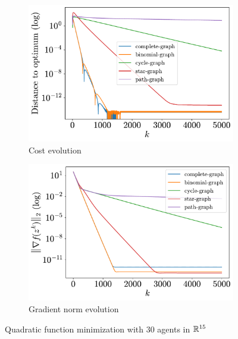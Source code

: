 \documentclass[a4paper,11pt,oneside]{book}
\begin{document}
\begin{figure}[H]
      \centering
      \begin{subfigure}[t]{0.46\linewidth}
            \centering
            \includegraphics[width=\linewidth]{./figs/quadratic/30_15/distance.pdf} 
            \caption{Cost evolution}
      \end{subfigure}
      \hfill
      \begin{subfigure}[t]{0.46\linewidth}
            \centering
            \includegraphics[width=\linewidth]{./figs/quadratic/30_15/gradient.pdf} 
            \caption{Gradient norm evolution}
      \end{subfigure}
      \caption{Quadratic function minimization with $30$ agents in ${\mathbb{R}}^{15}$}
      \label{fig:quadratic_30_15}
\end{figure}


\end{document}
